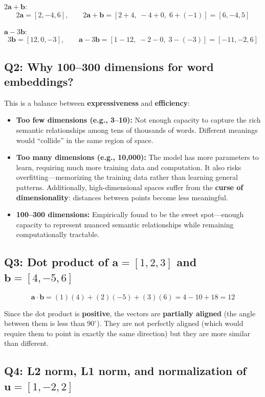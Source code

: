 \documentclass[11pt,a4paper]{article}
\begin{document}
\medskip
$2\mathbf{a} + \mathbf{b}$:
\[
2\mathbf{a} = [2, -4, 6], \qquad 2\mathbf{a} + \mathbf{b} = [2+4,\; -4+0,\; 6+(-1)] = [6, -4, 5]
\]

$\mathbf{a} - 3\mathbf{b}$:
\[
3\mathbf{b} = [12, 0, -3], \qquad \mathbf{a} - 3\mathbf{b} = [1-12,\; -2-0,\; 3-(-3)] = [-11, -2, 6]
\]

\subsection*{Q2: Why 100--300 dimensions for word embeddings?}

This is a balance between \textbf{expressiveness} and \textbf{efficiency}:

\begin{itemize}[leftmargin=1.5em]
    \item \textbf{Too few dimensions (e.g., 3--10):} Not enough capacity to capture the rich semantic relationships among tens of thousands of words. Different meanings would ``collide'' in the same region of space.
    \item \textbf{Too many dimensions (e.g., 10{,}000):} The model has more parameters to learn, requiring much more training data and computation. It also risks overfitting---memorizing the training data rather than learning general patterns. Additionally, high-dimensional spaces suffer from the \textbf{curse of dimensionality}: distances between points become less meaningful.
    \item \textbf{100--300 dimensions:} Empirically found to be the sweet spot---enough capacity to represent nuanced semantic relationships while remaining computationally tractable.
\end{itemize}

\subsection*{Q3: Dot product of $\mathbf{a} = [1, 2, 3]$ and $\mathbf{b} = [4, -5, 6]$}

\[
\mathbf{a} \cdot \mathbf{b} = (1)(4) + (2)(-5) + (3)(6) = 4 - 10 + 18 = 12
\]

Since the dot product is \textbf{positive}, the vectors are \textbf{partially aligned} (the angle between them is less than $90^\circ$). They are not perfectly aligned (which would require them to point in exactly the same direction) but they are more similar than different.

\subsection*{Q4: L2 norm, L1 norm, and normalization of $\mathbf{u} = [1, -2, 2]$}
\end{document}
